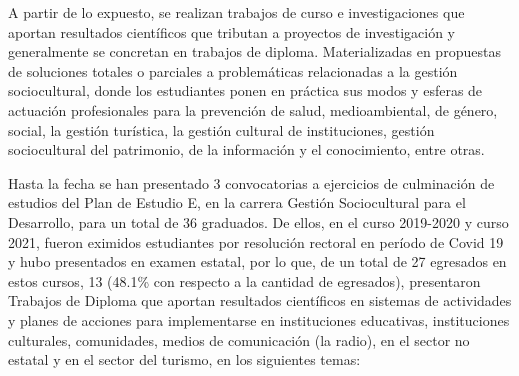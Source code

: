 A partir de lo expuesto, se realizan trabajos de curso e investigaciones que aportan resultados científicos que tributan a proyectos de investigación y generalmente se concretan en trabajos de diploma. Materializadas en propuestas de soluciones totales o parciales a problemáticas relacionadas a la gestión sociocultural, donde los estudiantes ponen en práctica sus modos y esferas de actuación profesionales para la prevención de salud, medioambiental, de género, social, la gestión turística, la gestión cultural de instituciones, gestión sociocultural del patrimonio, de la información y el conocimiento, entre otras.

Hasta la fecha se han presentado 3 convocatorias a ejercicios de culminación de estudios del Plan de Estudio E, en la carrera Gestión Sociocultural para el Desarrollo, para un total de 36 graduados. De ellos, en el curso 2019-2020 y curso 2021, fueron eximidos estudiantes por resolución rectoral en período de Covid 19 y hubo presentados en examen estatal, por lo que, de un total de 27 egresados en estos cursos, 13 (48.1\% con respecto a la cantidad de egresados), presentaron Trabajos de Diploma que aportan resultados científicos en sistemas de actividades y planes de acciones para implementarse en instituciones educativas, instituciones culturales, comunidades, medios de comunicación (la radio), en el sector no estatal y en el sector del turismo, en los siguientes temas:

